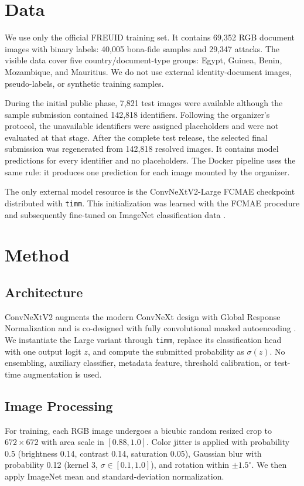 \documentclass[10pt,twocolumn]{article}
\begin{document}
\section{Data}
We use only the official FREUID training set. It contains 69,352 RGB document
images with binary labels: 40,005 bona-fide samples and 29,347 attacks. The
visible data cover five country/document-type groups: Egypt, Guinea, Benin,
Mozambique, and Mauritius. We do not use external identity-document images,
pseudo-labels, or synthetic training samples.

During the initial public phase, 7,821 test images were available although the
sample submission contained 142,818 identifiers. Following the organizer's
protocol, the unavailable identifiers were assigned placeholders and were not
evaluated at that stage. After the complete test release, the selected final
submission was regenerated from 142,818 resolved images. It contains model
predictions for every identifier and no placeholders. The Docker pipeline uses
the same rule: it produces one prediction for each image mounted by the
organizer.

The only external model resource is the ConvNeXtV2-Large FCMAE checkpoint
distributed with \texttt{timm}. This initialization was learned with the FCMAE
procedure and subsequently fine-tuned on ImageNet classification data
\cite{woo2023convnextv2,wightman2019timm}.

\section{Method}
\subsection{Architecture}
ConvNeXtV2 augments the modern ConvNeXt design with Global Response
Normalization and is co-designed with fully convolutional masked autoencoding
\cite{woo2023convnextv2}. We instantiate the Large variant through
\texttt{timm}, replace its classification head with one output logit $z$, and
compute the submitted probability as $\sigma(z)$. No ensembling, auxiliary
classifier, metadata feature, threshold calibration, or test-time augmentation
is used.

\subsection{Image Processing}
For training, each RGB image undergoes a bicubic random resized crop to
$672\!\times\!672$ with area scale in $[0.88,1.0]$. Color jitter is applied with
probability 0.5 (brightness 0.14, contrast 0.14, saturation 0.05), Gaussian blur
with probability 0.12 (kernel 3, $\sigma\in[0.1,1.0]$), and rotation within
$\pm1.5^\circ$. We then apply ImageNet mean and standard-deviation
normalization.
\end{document}
